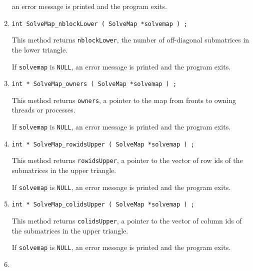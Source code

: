 \begin{enumerate}
an error message is printed and the program exits.
\item
\begin{verbatim}
int SolveMap_nblockLower ( SolveMap *solvemap ) ;
\end{verbatim}
This method returns {\tt nblockLower}, 
the number of off-diagonal submatrices in the lower triangle.
\par {}
If {\tt solvemap} is {\tt NULL},
an error message is printed and the program exits.
\item
\begin{verbatim}
int * SolveMap_owners ( SolveMap *solvemap ) ;
\end{verbatim}
This method returns {\tt owners}, a pointer to the map from fronts
to owning threads or processes.
\par {}
If {\tt solvemap} is {\tt NULL},
an error message is printed and the program exits.
\item
\begin{verbatim}
int * SolveMap_rowidsUpper ( SolveMap *solvemap ) ;
\end{verbatim}
This method returns {\tt rowidsUpper}, a pointer to the vector of
row ids of the submatrices in the upper triangle.
\par {}
If {\tt solvemap} is {\tt NULL},
an error message is printed and the program exits.
\item
\begin{verbatim}
int * SolveMap_colidsUpper ( SolveMap *solvemap ) ;
\end{verbatim}
This method returns {\tt colidsUpper}, a pointer to the vector of
column ids of the submatrices in the upper triangle.
\par {}
If {\tt solvemap} is {\tt NULL},
an error message is printed and the program exits.
\item

\end{enumerate}
